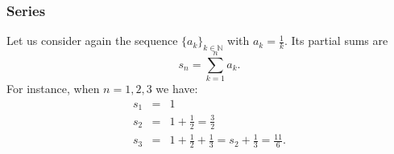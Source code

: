 \documentclass[notes=show,smaller,handout]{beamer}\usepackage[]{graphicx}\usepackage[]{color}
\begin{document}
\begin{frame}{\secname}

\frametitle{Series }


\begin{example}
Let us consider again the sequence $\{ a_k \}_{k \in \mathbb{N}}$ with $a_k = \frac{1}{k}$. Its partial sums are
$$
s_n =  \sum_{k=1}^{n} a_k.
$$
For instance, when $n=1,2,3$ we have:
\begin{eqnarray*}
s_1 &=& 1 \\
s_2 &=& 1 + \frac{1}{2} = \frac{3}{2}  \\
s_3 &=& 1 + \frac{1}{2} + \frac{1}{3} = s_2 + \frac{1}{3} = \frac{11}{6}.
\end{eqnarray*}


\end{example}

\end{frame}%
\end{document}
